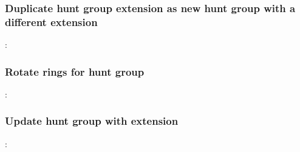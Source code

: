 \documentclass[letterpaper,10pt,english]{sphinxmanual}
\begin{document}
\subsubsection{Duplicate hunt group extension as new hunt group with a different extension}
\label{\detokenize{restapi:duplicate-hunt-group-extension-as-new-hunt-group-with-a-different-extension}}
:

\begin{sphinxVerbatim}[commandchars=\\\{\}]
      
\end{sphinxVerbatim}


\subsubsection{Rotate rings for hunt group}
\label{\detokenize{restapi:rotate-rings-for-hunt-group}}
:

\begin{sphinxVerbatim}[commandchars=\\\{\}]
      
\end{sphinxVerbatim}


\subsubsection{Update hunt group with extension}
\label{\detokenize{restapi:update-hunt-group-with-extension}}
:
\end{document}
